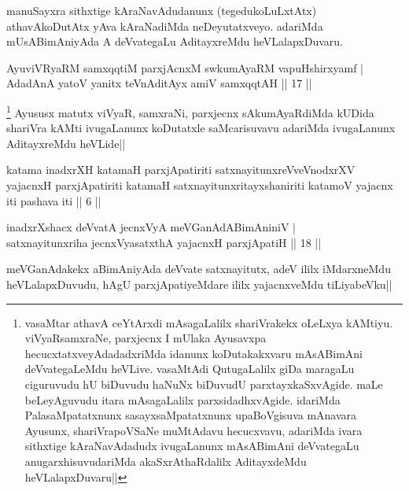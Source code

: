 \begin{artha}
manuSayxra sithxtige kAraNavAdudanunx (tegedukoLuLxtAtx) athavAkoDutAtx yAva kAraNadiMda neDeyutatxveyo. adariMda mUsABimAniyAda A deVvategaLu AditayxreMdu heVLalapxDuvaru.
\end{artha}%


\begin{shl}
AyuviVRyaRM samxqqtiM parxjAcnxM swkumAyaRM vapuHshirxyamf |\\
AdadAnA yatoV yanitx teVnA\s \s ditAyx amiV samxqqtAH \hfill || 17 ||
\end{shl}

\begin{artha}
\footnote[1]{vasaMtar athavA ceYtArxdi mAsagaLalilx shariVrakekx oLeLxya kAMtiyu. viVyaRsamxraNe, parxjecnx I mUlaka Ayusavxpa hecucxtatxveyAdadadxriMda idanunx koDutakakxvaru mAsABimAni deVvategaLeMdu heVLive. vasaMtAdi QutugaLalilx giDa maragaLu ciguruvudu hU biDuvudu haNuNx biDuvudU parxtayxkaSxvAgide. maLe beLeyAguvudu itara mAsagaLalilx parxsidadhxvAgide. idariMda PalasaMpatatxnunx sasayxsaMpatatxnunx upaBoVgisuva mAnavara Ayusunx, shariVrapoVSaNe muMtAdavu hecucxvavu, adariMda ivara sithxtige kAraNavAdadudx ivugaLanunx mAsABimAni deVvategaLu anugarxhisuvudariMda akaSxrAthaRdalilx AditayxdeMdu heVLalapxDuvaru||} Ayususx matutx viVyaR, samxraNi, parxjecnx sAkumAyaRdiMda kUDida shariVra kAMti ivugaLanunx koDutatxle saMcarisuvavu adariMda ivugaLanunx AditayxreMdu heVLide||
\end{artha}

\begin{shl}
katama inadxrXH katamaH parxjApatiriti satxnayitunxreVveVnodxrXV yajacnxH parxjApatiriti katamaH satxnayitunxritayxshaniriti katamoV yajacnx iti pashava iti || 6 ||
\end{shl}


\begin{shl}
inadxrXshacx deVvatA jecnxVyA meVGanAdABimAniniV |\\
satxnayitunxriha jecnxVyasatxthA yajacnxH parxjApatiH \hfill || 18 ||
\end{shl}

\begin{artha}
meVGanAdakekx aBimAniyAda deVvate satxnayitutx, adeV ililx iMdarxneMdu heVLalapxDuvudu, hAgU parxjApatiyeMdare ililx yajacnxveMdu tiLiyabeVku||
\end{artha}

